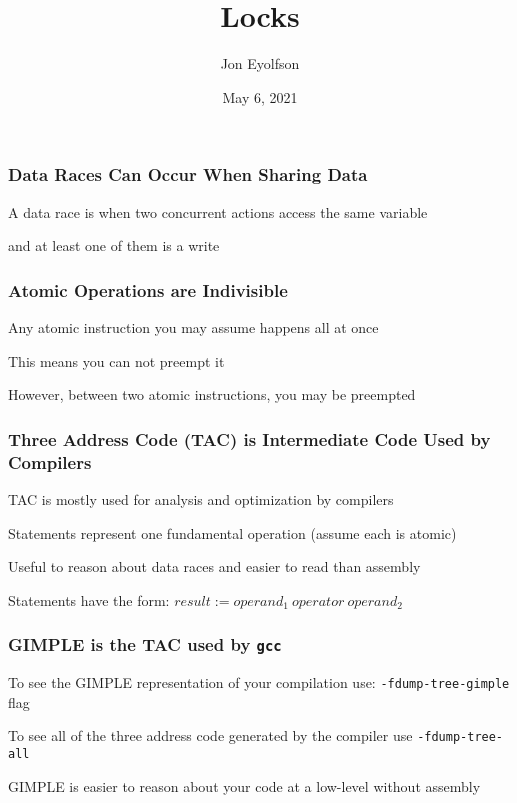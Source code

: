 

\title{Locks}
\author{Jon Eyolfson}
\date{May 6, 2021}


  \begin{frame}
    \titlepage
  \end{frame}
  \begin{frame}
    \frametitle{Data Races Can Occur When Sharing Data}

    A data race is when two concurrent actions access the same variable

    and at least one of them is a write
  \end{frame}

  \begin{frame}
    \frametitle{Atomic Operations are Indivisible}

    Any atomic instruction you may assume happens all at once

    \vspace{2em}

    This means you can not preempt it

    \vspace{2em}

    However, between two atomic instructions, you may be preempted
  \end{frame}

  \begin{frame}
    \frametitle{Three Address Code (TAC) is Intermediate Code Used by Compilers}

    TAC is mostly used for analysis and optimization by compilers

    \vspace{2em}

    Statements represent one fundamental operation (assume each is atomic)

    \hspace{2em} Useful to reason about data races and easier to read than assembly

    \vspace{2em}

    Statements have the form: $result := operand_1\:operator\:operand_2$
  \end{frame}

  \begin{frame}
    \frametitle{GIMPLE is the TAC used by \texttt{gcc}}

    To see the GIMPLE representation of your compilation use:
    {\tt -fdump-tree-gimple} flag

    \vspace{2em}

    To see all of the three address code generated by the compiler use
    {\tt -fdump-tree-all}

    \vspace{2em}

    GIMPLE is easier to reason about your code at a low-level without assembly
  \end{frame}

